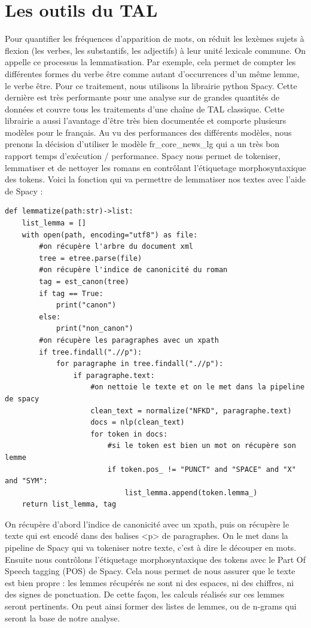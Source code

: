 \documentclass[a4paper,twoside,12pt]{book}
\begin{document}
 \section{Les outils du TAL}

Pour quantifier les fréquences d'apparition de mots, on réduit les lexèmes sujets à flexion (les verbes, les substantifs, les adjectifs) à leur unité lexicale commune. On appelle ce processus la lemmatisation. Par exemple, cela permet de compter les différentes formes du verbe être comme autant d'occurrences d'un même lemme, le verbe être. Pour ce traitement, nous utilisons la librairie python Spacy. Cette dernière est très performante pour une analyse sur de grandes quantités de données et couvre tous les traitements d'une chaîne de TAL classique. Cette librairie a aussi l'avantage d'être très bien documentée et comporte plusieurs modèles pour le français. Au vu des performances des différents modèles, nous prenons la décision d'utiliser le modèle fr\_core\_news\_lg qui a un très bon rapport temps d'exécution / performance. Spacy nous permet de tokeniser, lemmatiser et de nettoyer les romans en contrôlant l'étiquetage morphosyntaxique des tokens. Voici la fonction qui va permettre de lemmatiser nos textes avec l'aide de Spacy :

\begin{verbatim}
def lemmatize(path:str)->list:
    list_lemma = []
    with open(path, encoding="utf8") as file:
        #on récupère l'arbre du document xml
        tree = etree.parse(file)
        #on récupère l'indice de canonicité du roman
        tag = est_canon(tree)
        if tag == True:
            print("canon")
        else:
            print("non_canon")
        #on récupère les paragraphes avec un xpath
        if tree.findall(".//p"):
            for paragraphe in tree.findall(".//p"):
                if paragraphe.text:
                    #on nettoie le texte et on le met dans la pipeline de spacy
                    clean_text = normalize("NFKD", paragraphe.text)
                    docs = nlp(clean_text)
                    for token in docs:
                        #si le token est bien un mot on récupère son lemme
                        if token.pos_ != "PUNCT" and "SPACE" and "X" and "SYM":
                            list_lemma.append(token.lemma_)
    return list_lemma, tag

\end{verbatim}

On récupère d'abord l'indice de canonicité avec un xpath, puis on récupère le texte qui est encodé dans des balises <p> de paragraphes. On le met dans la pipeline de Spacy qui va tokeniser notre texte, c'est à dire le découper en mots. Ensuite nous contrôlons l'étiquetage morphosyntaxique des tokens avec le Part Of Speech tagging (POS) de Spacy. Cela nous permet de nous assurer que le texte est bien propre : les lemmes récupérés ne sont ni des espaces, ni des chiffres, ni des signes de ponctuation. De cette façon, les calculs réalisés sur ces lemmes seront pertinents. On peut ainsi former des listes de lemmes, ou de n-grams qui seront la base de notre analyse.
\end{document}
